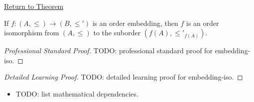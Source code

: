 \newpage
{}
\label{prf:embedding-iso}

\begin{remark*}[Return]
\hyperref[prop:embedding-iso]{Return to Theorem}
\end{remark*}

\begin{theorem*}
If $f : (A, \leq) \to (B, \leq')$ is an order embedding, then $f$ is an
order isomorphism from $(A, \leq)$ to the suborder $(f(A), \leq'_{f(A)})$.
\end{theorem*}

\begin{proof}[Professional Standard Proof]
\LRAProofBodyStart
TODO: professional standard proof for embedding-iso.
\end{proof}

\begin{proof}[Detailed Learning Proof]
\LRAProofBodyStart
TODO: detailed learning proof for embedding-iso.
\end{proof}

\begin{remark*}
\end{remark*}

\begin{dependencies}
\begin{itemize}
  \item TODO: list mathematical dependencies.
\end{itemize}
\end{dependencies}

\clearpage
